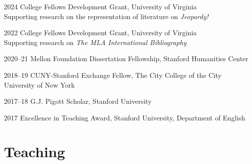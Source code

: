 \documentclass[12pt,letterpaper]{report}
\begin{document}
\begin{tablist}
	\item[2024] \tab{}College Fellows Development Grant, University of Virginia \\
	Supporting research on the representation of literature on \textit{Jeopardy!}
	\item[2022] \tab{}College Fellows Development Grant, University of Virginia \\
	Supporting research on \textit{The MLA International Bibliography}
	\item[2020--21] \tab{}Mellon Foundation Dissertation Fellowship, Stanford Humanities Center
	\item[2018--19] \tab{}CUNY-Stanford Exchange Fellow, The City College of the City University of New York
	\item[2017--18] \tab{}G.J. Pigott Scholar, Stanford University
	\item[2017] \tab{}Excellence in Teaching Award, Stanford University, Department of English
\end{tablist}

\section*{Teaching}
\end{document}
